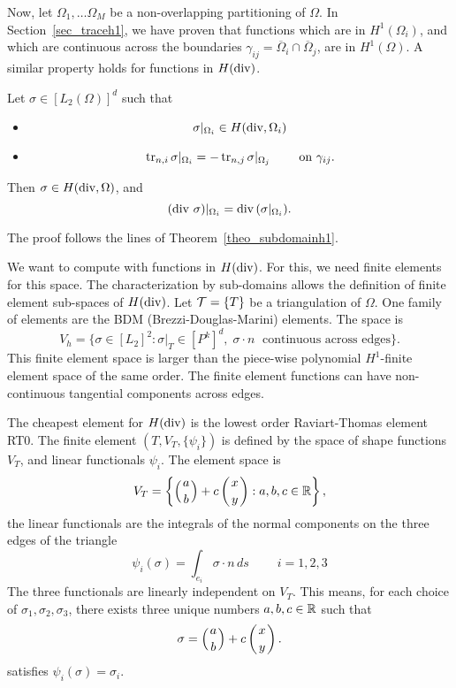 Now, let $\Omega_1, \ldots \Omega_M$ be a non-overlapping partitioning of $\Omega$.
In Section~\ref{sec_traceh1}, we have proven that functions which are 
in $H^1(\Omega_i)$, and which are continuous across the boundaries 
$\gamma_{ij} = \overline \Omega_i \cap \overline \Omega_j$, are in $H^1(\Omega)$. 
A similar property holds for functions in $H(\operatorname{div})$. 

\begin{theorem} Let $\sigma \in [L_2(\Omega)]^d$ such that
\begin{itemize}
\item
$$
\sigma|_{\Omega_i} \in H(\operatorname{div}, \Omega_i)
$$
\item
$$
\operatorname{tr}_{n,i} \sigma|_{\Omega_i} = - \operatorname{tr}_{n,j} \sigma|_{\Omega_j} \qquad \mbox{ on } \gamma_{ij}.
$$
\end{itemize}
Then $\sigma \in H(\operatorname{div}, \Omega)$, and 
$$
(\operatorname{div} \, \sigma)|_{\Omega_i} = \operatorname{div} \, (\sigma|_{\Omega_i}).
$$
\end{theorem}
The proof follows the lines of Theorem~\ref{theo_subdomainh1}.

\bigskip

We want to compute with functions in $H(\operatorname{div})$. For this, we need
finite elements for this space. The characterization by sub-domains
allows the definition of finite element sub-spaces of $H(\operatorname{div})$. Let
${\cal T} = \{ T \}$ be a triangulation of $\Omega$.  One family of
elements are the BDM (Brezzi-Douglas-Marini) elements. The space is
%
$$
V_h = \{ \sigma \in [L_2]^2 : \sigma|_T \in [P^k]^d, \; \sigma \cdot n \; \mbox{ continuous across edges} \}.
$$
%
This finite element space is larger than the piece-wise polynomial
$H^1$-finite element space of the same order.  The finite element
functions can have non-continuous tangential components across edges.

\bigskip

The cheapest element for $H(\operatorname{div})$ is the lowest order Raviart-Thomas 
element RT0. The finite element $(T, V_T, \{ \psi_i \})$ is defined by the 
space of shape functions $V_T$, and linear functionals $\psi_i$. The
element space is
$$
V_T = \left\{ \left( a \atop b \right) + c \left( x \atop y \right) : a,b,c \in {\mathbb R} \right\},
$$
the linear functionals are the integrals of the normal components on the three
edges of the triangle
$$
\psi_i(\sigma) = \int_{e_i} \sigma \cdot n \, ds \qquad \; i = 1,2,3
$$
The three functionals are linearly independent on $V_T$. This means,
for each choice of $\sigma_1, \sigma_2, \sigma_3$, there exists three 
unique numbers $a,b,c \in {\mathbb R}$ such that 
$$
\sigma = \left( a \atop b \right) + c \left( x \atop y \right).
$$
satisfies $\psi_i(\sigma) = \sigma_i$.

